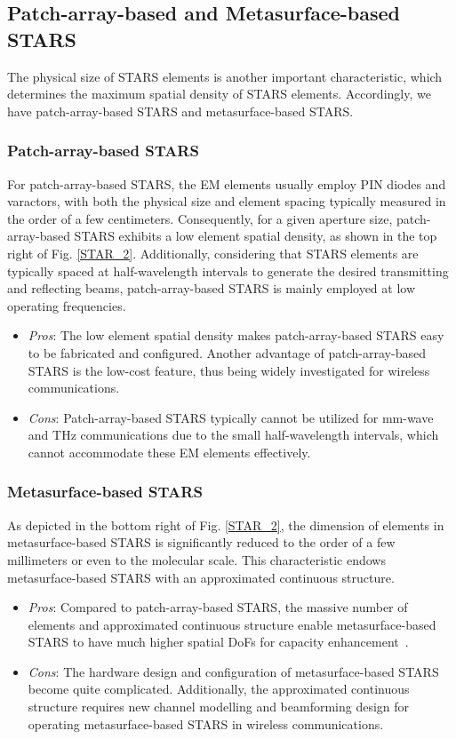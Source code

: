 \documentclass[journal]{IEEEtran}
\theoremstyle{definition}
\begin{document}
\subsection{Patch-array-based and Metasurface-based STARS}
The physical size of STARS elements is another important characteristic, which determines the maximum spatial density of STARS elements. Accordingly, we have patch-array-based STARS and metasurface-based STARS.
\subsubsection{Patch-array-based STARS} For patch-array-based STARS, the EM elements usually employ PIN diodes and varactors, with both the physical size and element spacing typically measured in the order of a few centimeters. Consequently, for a given aperture size, patch-array-based STARS exhibits a low element spatial density, as shown in the top right of Fig. \ref{STAR_2}. Additionally, considering that STARS elements are typically spaced at half-wavelength intervals to generate the desired transmitting and reflecting beams, patch-array-based STARS is mainly employed at low operating frequencies.
\begin{itemize}	
	\item \emph{Pros}: The low element spatial density makes patch-array-based STARS easy to be fabricated and configured. Another advantage of patch-array-based STARS is the low-cost feature, thus being widely investigated for wireless communications.
    \item \emph{Cons}: Patch-array-based STARS typically cannot be utilized for mm-wave and THz communications due to the small half-wavelength intervals, which cannot accommodate these EM elements effectively.
\end{itemize}

\subsubsection{Metasurface-based STARS} As depicted in the bottom right of Fig. \ref{STAR_2}, the dimension of elements in metasurface-based STARS is significantly reduced to the order of a few millimeters or even to the molecular scale. This characteristic endows metasurface-based STARS with an approximated continuous structure.
\begin{itemize}	
	\item \emph{Pros}: Compared to patch-array-based STARS, the massive number of elements and approximated continuous structure enable metasurface-based STARS to have much higher spatial DoFs for capacity enhancement~\cite{10232975}.
    \item \emph{Cons}: The hardware design and configuration of metasurface-based STARS become quite complicated. Additionally, the approximated continuous structure requires new channel modelling and beamforming design for operating metasurface-based STARS in wireless communications.
\end{itemize}
\end{document}
